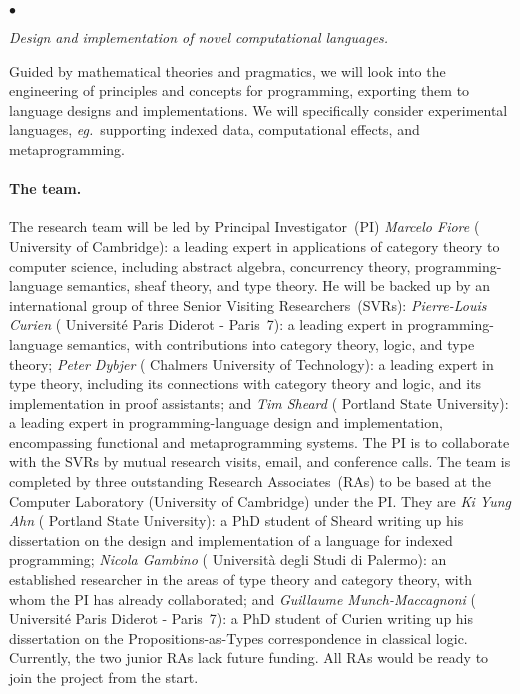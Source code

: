 \documentclass[11pt,twocolumn]{article}
\newenvironment{myitemize}
  {\begin{list}{$\bullet$}
  {\setlength{\topsep}{1pt}
   \setlength{\partopsep}{1pt}
   \setlength{\itemsep}{0pt}
   \setlength{\parsep}{0pt}
   \setlength{\leftmargin}{1em}
   \setlength{\labelwidth}{.5em}}}
  {\end{list}}
\newcommand{\eg}{\emph{eg.}}
\begin{document}
\begin{myitemize}
\item[{\bfseries 4\enspace Programming:}]\mbox{}\enspace\thinspace
  \emph{Design and implementation of novel computational languages.}

  \vspace*{1mm}
  Guided by mathematical theories and pragmatics, we will look into the
  engineering of principles and concepts for programming, exporting them to
  language designs and implementations.  We will specifically consider
  experimental languages, \eg~supporting indexed data,
  computational effects, and metaprogramming.  
\end{myitemize}

\paragraph*{The team.}

The research team will be led by Principal Investigator~(PI) \emph{Marcelo
Fiore} (%
University of Cambridge): 
    a leading expert in applications of category theory to computer science,
    including abstract algebra, concurrency theory, programming-language
    semantics, sheaf theory, and type theory.  
He will be backed up by an international group of three Senior Visiting
Researchers~(SVRs): \emph{Pierre-Louis Curien} (%
Universit\'e Paris Diderot - Paris~7): 
  a leading expert in programming-language semantics, with contributions into
  category theory, logic, %
  and type theory; 
  \emph{Peter \mbox{Dybjer}} (%
Chalmers University of Technology): 
  a leading expert in type theory, including its connections with category
  theory and logic, and its implementation in proof assistants; and 
  \emph{Tim Sheard} (%
Portland State University): 
  a leading expert in pro\-gram\-ming-language design and implementation,
  encompassing functional and metaprogramming systems. 
%
The PI is to collaborate with the SVRs by mutual research visits, email, and
conference calls.
%
The team is completed by three outstanding Research Associates~(RAs) to be
based at the Computer Laboratory (University of Cambridge) under the PI.  They
are
  \emph{Ki Yung Ahn} (%
Portland State University): 
  a PhD student of Sheard writing up his dissertation on the design and
  implementation of a language for indexed programming;
  \emph{Nicola \mbox{Gambino}} (%
Universit\`a degli Studi di Palermo):  
  an established researcher in the areas of type theory and category theory,
  with whom the PI has already collaborated; and 
  \emph{Guillaume Munch-Maccagnoni} (%
Universit\'e Paris Diderot - Paris~7): 
  a PhD student of Curien writing up his dissertation on the
  Propositions-as-Types correspondence in classical logic.
Currently, the two junior RAs lack future funding.  All RAs would be ready
to join the project from the start.
\end{document}
